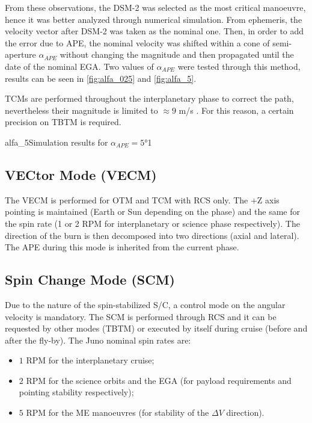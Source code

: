 From these observations, the DSM-2 was selected as the most critical manoeuvre, hence it was better analyzed through numerical simulation.
From ephemeris, the velocity vector after DSM-2 was taken as the nominal one.
Then, in order to add the error due to APE, the nominal velocity was shifted within a cone of semi-aperture $\alpha_{APE}$ without changing the magnitude and then propagated until the date of the nominal EGA.
Two values of $\alpha_{APE}$ were tested through this method, results can be seen in \autoref{fig:alfa_025} and \autoref{fig:alfa_5}.

TCMs are performed throughout the interplanetary phase to correct the path, nevertheless their magnitude is limited to $\approx 9$ m/s \mref.
For this reason, a certain precision on TBTM is required.

{alfa_5}{Simulation results for $\alpha_{APE} = 5$°}{1}

\subsection{VECtor Mode (VECM)}
\label{subsec:vec_mode}

The VECM is performed for OTM and TCM with RCS only. The +Z axis pointing is maintained (Earth or Sun depending on the phase) and the same for the spin rate (1 or 2 RPM for interplanetary or science phase respectively). The direction of the burn is then decomposed into two directions (axial and lateral). The APE during this mode is inherited from the current phase. 

\subsection{Spin Change Mode (SCM)}
\label{subsec:spin_change_mode}

Due to the nature of the spin-stabilized S/C, a control mode on the angular velocity is mandatory. The SCM is performed through RCS and it can be requested by other modes (TBTM) or executed by itself during cruise (before and after the fly-by). The Juno nominal spin rates are:
\begin{itemize}
    \item $1$ RPM for the interplanetary cruise;
    \item $2$ RPM for the science orbits and the EGA (for payload requirements and pointing stability respectively); 
    \item $5$ RPM for the ME manoeuvres (for stability of the $\Delta V$ direction). 
\end{itemize}

